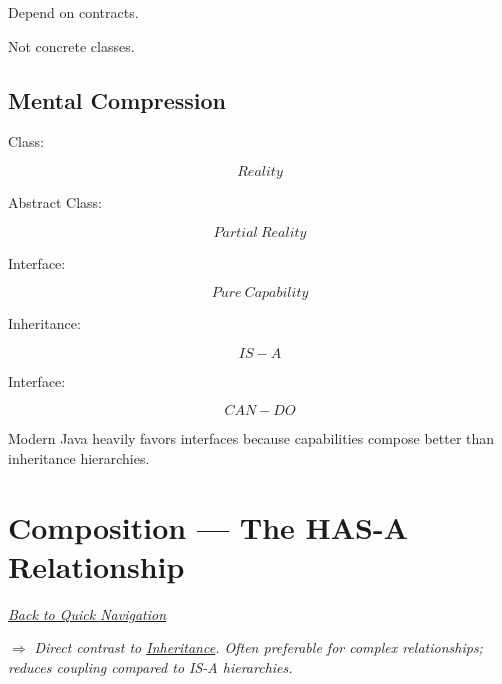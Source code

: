 \documentclass[11pt,a4paper]{book}
\begin{document}
\begin{rosettarule}

Depend on contracts.

Not concrete classes.

\end{rosettarule}


\section{Mental Compression}

Class:

\[
Reality
\]


Abstract Class:

\[
Partial\ Reality
\]


Interface:

\[
Pure\ Capability
\]


Inheritance:

\[
IS\!-\!A
\]


Interface:

\[
CAN\!-\!DO
\]


Modern Java heavily favors
interfaces because capabilities
compose better than inheritance hierarchies.

\chapter{Composition --- The HAS-A Relationship}\label{chap:composition}

\smallskip
\noindent
\hyperref[sec:quick_nav]{\emph{Back to Quick Navigation}}

\smallskip
\noindent
\textcolor{RosettaRoyalPurple}{$\Rightarrow$}
\emph{Direct contrast to \hyperref[chap:inheritance]{Inheritance}. Often preferable for complex relationships; reduces coupling compared to IS-A hierarchies.}
\end{document}
